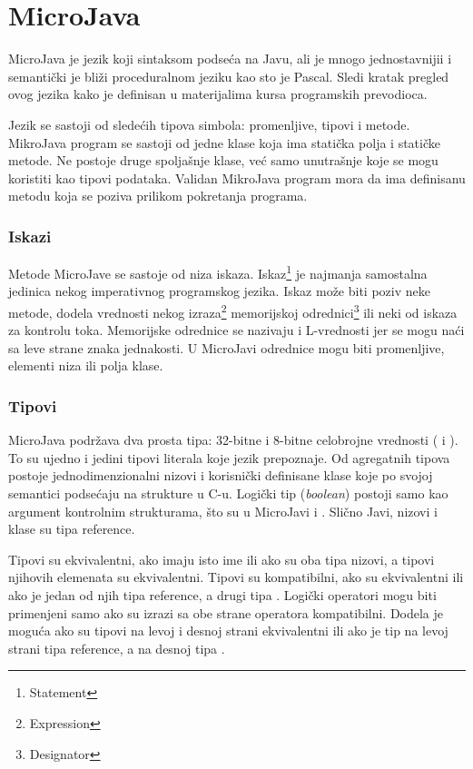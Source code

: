 
\chapter{MicroJava}
\label{ch:microjava}

MicroJava je jezik koji sintaksom podseća na Javu, ali je mnogo jednostavnijii i semantički je bliži proceduralnom jeziku kao sto je Pascal.
Sledi kratak pregled ovog jezika kako je definisan u materijalima kursa programskih prevodioca.

Jezik se sastoji od sledećih tipova simbola: promenljive, tipovi i metode. 
MikroJava program se sastoji od jedne klase koja ima statička polja i statičke metode. 
Ne postoje druge spoljašnje klase, već samo unutrašnje koje se mogu koristiti kao tipovi podataka. 
Validan  MikroJava program mora da ima definisanu metodu  koja se poziva prilikom pokretanja programa.

\subsection*{Iskazi}

Metode MicroJave se sastoje od niza iskaza. 
Iskaz\footnote{\eng Statement} 
	je najmanja samostalna jedinica nekog imperativnog programskog jezika. 
Iskaz može biti poziv neke metode, dodela vrednosti nekog izraza\footnote{\eng Expression} 
	memorijskoj odrednici\footnote{\eng Designator} 
	ili neki od iskaza za kontrolu toka. 
Memorijske odrednice se nazivaju i L-vrednosti jer se mogu naći sa leve strane znaka jednakosti. 
U MicroJavi odrednice mogu biti promenljive, elementi niza ili polja klase.

\subsection*{Tipovi}

MicroJava podržava dva prosta tipa: 32-bitne i 8-bitne celobrojne vrednosti ( i ). 
To su ujedno i jedini tipovi literala koje jezik prepoznaje. 
Od agregatnih tipova postoje jednodimenzionalni nizovi i korisnički definisane klase koje po svojoj semantici podsećaju na strukture u C-u. 
Logički tip (\textit{boolean}) postoji samo kao argument kontrolnim strukturama, što su u MicroJavi  i . 
Slično Javi, nizovi i klase su tipa reference.

Tipovi su ekvivalentni, ako imaju isto ime ili ako su oba tipa nizovi, a tipovi njihovih elemenata su ekvivalentni. 
Tipovi su kompatibilni, ako su ekvivalentni ili ako je jedan od njih tipa reference, a drugi tipa . 
Logički operatori mogu biti primenjeni samo ako su izrazi sa obe strane operatora kompatibilni. 
Dodela je moguća ako su tipovi na levoj i desnoj strani ekvivalentni ili ako je tip na levoj strani tipa reference, a na desnoj tipa .

